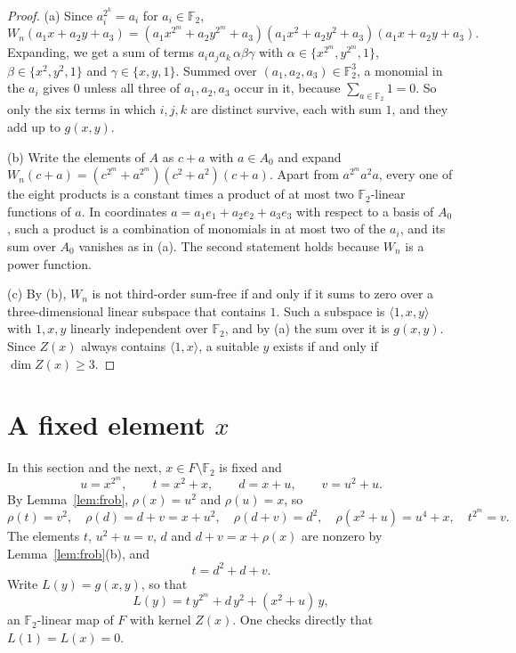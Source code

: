 \documentclass[11pt,a4paper,reqno]{amsart}
\theoremstyle{remark}
\numberwithin{equation}{section}
\newcommand{\F}{\mathbb{F}}
\begin{document}
\begin{proof}
(a) Since $a_i^{2^k}=a_i$ for $a_i\in\F_2$,
\[
W_n(a_1x+a_2y+a_3)=(a_1x^{2^m}+a_2y^{2^m}+a_3)(a_1x^2+a_2y^2+a_3)(a_1x+a_2y+a_3).
\]
Expanding, we get a sum of terms $a_ia_ja_k\,\alpha\beta\gamma$ with $\alpha\in\{x^{2^m},y^{2^m},1\}$, $\beta\in\{x^2,y^2,1\}$ and $\gamma\in\{x,y,1\}$. Summed over $(a_1,a_2,a_3)\in\F_2^3$, a monomial in the $a_i$ gives $0$ unless all three of $a_1,a_2,a_3$ occur in it, because $\sum_{a\in\F_2}1=0$. So only the six terms in which $i,j,k$ are distinct survive, each with sum $1$, and they add up to $g(x,y)$.

(b) Write the elements of $A$ as $c+a$ with $a\in A_0$ and expand $W_n(c+a)=(c^{2^m}+a^{2^m})(c^2+a^2)(c+a)$. Apart from $a^{2^m}a^2a$, every one of the eight products is a constant times a product of at most two $\F_2$-linear functions of $a$. In coordinates $a=a_1e_1+a_2e_2+a_3e_3$ with respect to a basis of $A_0$, such a product is a combination of monomials in at most two of the $a_i$, and its sum over $A_0$ vanishes as in (a). The second statement holds because $W_n$ is a power function.

(c) By (b), $W_n$ is not third-order sum-free if and only if it sums to zero over a three-dimensional linear subspace that contains $1$. Such a subspace is $\langle 1,x,y\rangle$ with $1,x,y$ linearly independent over $\F_2$, and by (a) the sum over it is $g(x,y)$. Since $Z(x)$ always contains $\langle1,x\rangle$, a suitable $y$ exists if and only if $\dim Z(x)\ge3$.
\end{proof}

\section{A fixed element \texorpdfstring{$x$}{x}}\label{sec:fixed}

In this section and the next, $x\in F\setminus\F_2$ is fixed and
\[
u=x^{2^m},\qquad t=x^2+x,\qquad d=x+u,\qquad v=u^2+u .
\]
By Lemma~\ref{lem:frob}, $\rho(x)=u^2$ and $\rho(u)=x$, so
\begin{equation}\label{eq:rho}
\rho(t)=v^2,\quad \rho(d)=d+v=x+u^2,\quad \rho(d+v)=d^2,\quad \rho(x^2+u)=u^4+x,\quad t^{2^m}=v .
\end{equation}
The elements $t$, $u^2+u=v$, $d$ and $d+v=x+\rho(x)$ are nonzero by Lemma~\ref{lem:frob}(b), and
\begin{equation}\label{eq:t}
t=d^2+d+v .
\end{equation}
Write $L(y)=g(x,y)$, so that
\[
L(y)=t\,y^{2^m}+d\,y^2+(x^2+u)\,y ,
\]
an $\F_2$-linear map of $F$ with kernel $Z(x)$. One checks directly that $L(1)=L(x)=0$.
\end{document}
